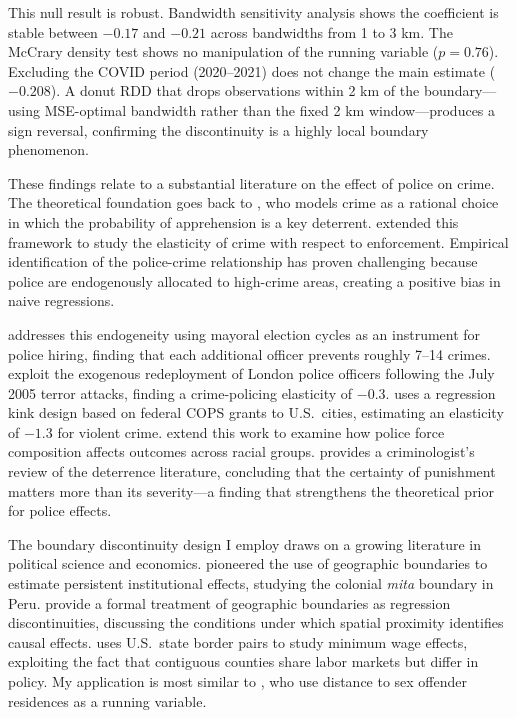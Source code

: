 \documentclass[12pt]{article}
\begin{document}
This null result is robust. Bandwidth sensitivity analysis shows the coefficient is stable between $-0.17$ and $-0.21$ across bandwidths from 1 to 3 km. The McCrary density test shows no manipulation of the running variable ($p = 0.76$). Excluding the COVID period (2020--2021) does not change the main estimate ($-0.208$). A donut RDD that drops observations within 2 km of the boundary---using MSE-optimal bandwidth rather than the fixed 2 km window---produces a sign reversal, confirming the discontinuity is a highly local boundary phenomenon.

These findings relate to a substantial literature on the effect of police on crime. The theoretical foundation goes back to \citet{becker1968}, who models crime as a rational choice in which the probability of apprehension is a key deterrent. \citet{ehrlich1973} extended this framework to study the elasticity of crime with respect to enforcement. Empirical identification of the police-crime relationship has proven challenging because police are endogenously allocated to high-crime areas, creating a positive bias in naive regressions.

\citet{levitt1997} addresses this endogeneity using mayoral election cycles as an instrument for police hiring, finding that each additional officer prevents roughly 7--14 crimes. \citet{draca2011} exploit the exogenous redeployment of London police officers following the July 2005 terror attacks, finding a crime-policing elasticity of $-0.3$. \citet{mello2019} uses a regression kink design based on federal COPS grants to U.S.\ cities, estimating an elasticity of $-1.3$ for violent crime. \citet{chalfin2022} extend this work to examine how police force composition affects outcomes across racial groups. \citet{nagin2013} provides a criminologist's review of the deterrence literature, concluding that the certainty of punishment matters more than its severity---a finding that strengthens the theoretical prior for police effects.

The boundary discontinuity design I employ draws on a growing literature in political science and economics. \citet{dell2010} pioneered the use of geographic boundaries to estimate persistent institutional effects, studying the colonial \textit{mita} boundary in Peru. \citet{keele2015} provide a formal treatment of geographic boundaries as regression discontinuities, discussing the conditions under which spatial proximity identifies causal effects. \citet{dube2019} uses U.S.\ state border pairs to study minimum wage effects, exploiting the fact that contiguous counties share labor markets but differ in policy. My application is most similar to \citet{linden2008}, who use distance to sex offender residences as a running variable.
\end{document}
